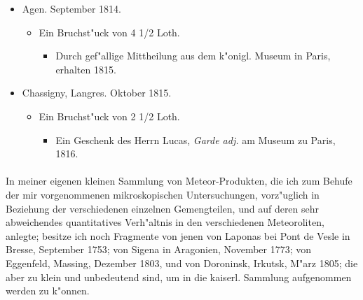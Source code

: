 \documentclass[a4paper, 11pt, oneside, polutonikogreek, german]{article}
\begin{document}
\begin{itemize}
\begin{itemize}
\begin{itemize}
        \end{itemize}
    \end{itemize}
    \item Agen. September 1814.
    \begin{itemize}
        \item Ein Bruchst"uck von 4 1/2 Loth.
        \begin{itemize}
            \item Durch gef"allige Mittheilung aus dem k"onigl. Museum in Paris, erhalten 1815.
        \end{itemize}
    \end{itemize}
    \item Chassigny, Langres. Oktober 1815.
    \begin{itemize}
        \item Ein Bruchst"uck von 2 1/2 Loth.
        \begin{itemize}
            \item Ein Geschenk des Herrn Lucas, \emph{Garde adj.} am Museum zu Paris, 1816.
        \end{itemize}
    \end{itemize}
\end{itemize}
\paragraph{}
In meiner eigenen kleinen Sammlung von Meteor-Produkten, die ich zum Behufe der mir vorgenommenen mikroskopischen Untersuchungen, vorz"uglich in Beziehung der verschiedenen einzelnen Gemengteilen, und auf deren sehr abweichendes quantitatives Verh"altnis in den verschiedenen Meteoroliten, anlegte; besitze ich noch Fragmente von jenen von Laponas bei Pont de Vesle in Bresse, September 1753; von Sigena in Aragonien, November 1773; von Eggenfeld, Massing, Dezember 1803, und von Doroninsk, Irkutsk, M"arz 1805; die aber zu klein und unbedeutend sind, um in die kaiserl. Sammlung aufgenommen werden zu k"onnen.
\end{document}
